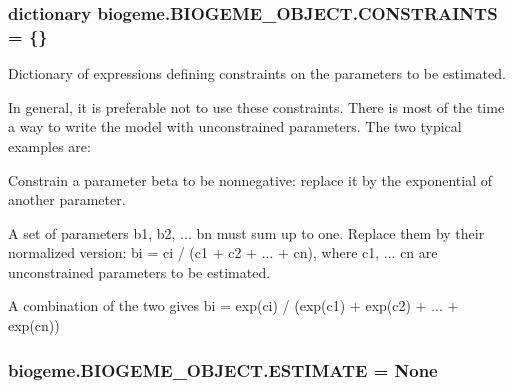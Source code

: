 \hypertarget{classbiogeme_1_1_b_i_o_g_e_m_e___o_b_j_e_c_t_a7eb3a18b4249b2ead855e356c2b40ad4}{
\subsubsection[{C\+O\+N\+S\+T\+R\+A\+I\+N\+T\+S}]{\setlength{\rightskip}{0pt plus 5cm}dictionary biogeme.\+B\+I\+O\+G\+E\+M\+E\+\_\+\+O\+B\+J\+E\+C\+T.\+C\+O\+N\+S\+T\+R\+A\+I\+N\+T\+S = \{\}\hspace{0.3cm}{\ttfamily [static]}}}\label{classbiogeme_1_1_b_i_o_g_e_m_e___o_b_j_e_c_t_a7eb3a18b4249b2ead855e356c2b40ad4}


Dictionary of expressions defining constraints on the parameters to be estimated. 

In general, it is preferable not to use these constraints. There is most of the time a way to write the model with unconstrained parameters. The two typical examples are\+:
\begin{DoxyItemize}
\item Constrain a parameter beta to be nonnegative\+: replace it by the exponential of another parameter.
\item A set of parameters b1, b2, ... bn must sum up to one. Replace them by their normalized version\+: bi = ci / (c1 + c2 + ... + cn), where c1, ... cn are unconstrained parameters to be estimated.
\item A combination of the two gives bi = exp(ci) / (exp(c1) + exp(c2) + ... + exp(cn)) 
\end{DoxyItemize}\hypertarget{classbiogeme_1_1_b_i_o_g_e_m_e___o_b_j_e_c_t_a3e2437d2271f3f9fe27913e1e1312c47}{
\subsubsection[{E\+S\+T\+I\+M\+A\+T\+E}]{\setlength{\rightskip}{0pt plus 5cm}biogeme.\+B\+I\+O\+G\+E\+M\+E\+\_\+\+O\+B\+J\+E\+C\+T.\+E\+S\+T\+I\+M\+A\+T\+E = None\hspace{0.3cm}{\ttfamily [static]}}}\label{classbiogeme_1_1_b_i_o_g_e_m_e___o_b_j_e_c_t_a3e2437d2271f3f9fe27913e1e1312c47}


